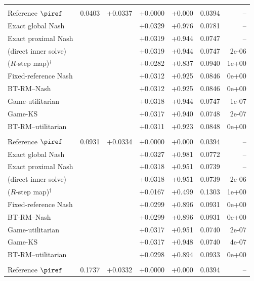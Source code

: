 \begin{tabular}{l r r r r r r}
\addlinespace
\multicolumn{7}{l}{\textit{$\alpha=0.50$}} \\
\quad Reference $\piref$ & 0.0403 & +0.0337 & +0.0000 & +0.000 & 0.0394 & -- \\
\quad Exact global Nash &  &  & +0.0329 & +0.976 & 0.0781 & -- \\
\quad Exact proximal Nash &  &  & +0.0319 & +0.944 & 0.0747 & -- \\
\quad \NBPO{} (direct inner solve) &  &  & +0.0319 & +0.944 & 0.0747 & 2e-06 \\
\quad \NBPO{} ($R$-step map)$^{\dagger}$ &  &  & +0.0282 & +0.837 & 0.0940 & 1e+00 \\
\quad Fixed-reference Nash &  &  & +0.0312 & +0.925 & 0.0846 & 0e+00 \\
\quad BT-RM--Nash &  &  & +0.0312 & +0.925 & 0.0846 & 0e+00 \\
\quad Game-utilitarian &  &  & +0.0318 & +0.944 & 0.0747 & 1e-07 \\
\quad Game-KS &  &  & +0.0317 & +0.940 & 0.0748 & 2e-07 \\
\quad BT-RM--utilitarian &  &  & +0.0311 & +0.923 & 0.0848 & 0e+00 \\
\addlinespace
\multicolumn{7}{l}{\textit{$\alpha=0.75$}} \\
\quad Reference $\piref$ & 0.0931 & +0.0334 & +0.0000 & +0.000 & 0.0394 & -- \\
\quad Exact global Nash &  &  & +0.0327 & +0.981 & 0.0772 & -- \\
\quad Exact proximal Nash &  &  & +0.0318 & +0.951 & 0.0739 & -- \\
\quad \NBPO{} (direct inner solve) &  &  & +0.0318 & +0.951 & 0.0739 & 2e-06 \\
\quad \NBPO{} ($R$-step map)$^{\dagger}$ &  &  & +0.0167 & +0.499 & 0.1303 & 1e+00 \\
\quad Fixed-reference Nash &  &  & +0.0299 & +0.896 & 0.0931 & 0e+00 \\
\quad BT-RM--Nash &  &  & +0.0299 & +0.896 & 0.0931 & 0e+00 \\
\quad Game-utilitarian &  &  & +0.0317 & +0.951 & 0.0740 & 2e-07 \\
\quad Game-KS &  &  & +0.0317 & +0.948 & 0.0740 & 4e-07 \\
\quad BT-RM--utilitarian &  &  & +0.0298 & +0.894 & 0.0933 & 0e+00 \\
\addlinespace
\multicolumn{7}{l}{\textit{$\alpha=1.00$}} \\
\quad Reference $\piref$ & 0.1737 & +0.0332 & +0.0000 & +0.000 & 0.0394 & -- \\

\end{tabular}
